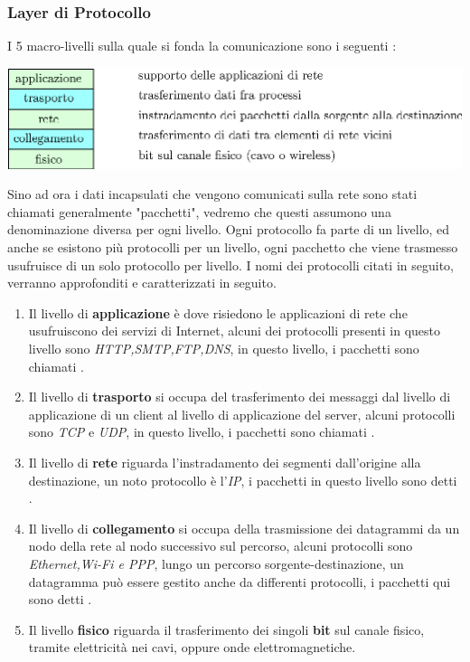\documentclass[12pt, letterpaper]{article}
\newcommand{\textg}[1]{\color{g}{\textbf{#1}}\color{black}}
\begin{document}
\subsubsection{Layer di Protocollo}
I 5 macro-livelli sulla quale si fonda la comunicazione sono i seguenti :
\begin{center}
    \includegraphics[width=1\textwidth ]{images/livelli.eps}
\end{center}
Sino ad ora i dati incapsulati che vengono comunicati sulla rete sono stati chiamati generalmente
"pacchetti", vedremo che questi assumono una denominazione diversa per ogni livello. Ogni protocollo
fa parte di un livello, ed anche se esistono più protocolli per un livello, ogni pacchetto
che viene trasmesso usufruisce di un solo protocollo per livello. I nomi dei protocolli citati in
seguito, verranno approfonditi e caratterizzati in seguito.
\begin{enumerate}
    \item Il livello di \textbf{applicazione} è dove risiedono le applicazioni di rete che
          usufruiscono dei servizi di Internet, alcuni dei protocolli presenti in questo livello
          sono \textit{HTTP,SMTP,FTP,DNS}, in questo livello, i pacchetti sono chiamati
          \textg{messaggi}.
    \item Il livello di \textbf{trasporto} si occupa del trasferimento dei messaggi  dal livello di
          applicazione di un client al livello di applicazione del server, alcuni protocolli sono
          \textit{TCP} e \textit{UDP}, in questo livello, i pacchetti sono chiamati
          \textg{segmenti}.
    \item Il livello di \textbf{rete} riguarda l'instradamento dei segmenti dall'origine alla
          destinazione, un noto protocollo è l'\textit{IP}, i pacchetti in questo livello sono detti
          \textg{datagrammi}.
    \item Il livello di \textbf{collegamento} si occupa della trasmissione dei datagrammi da un
          nodo della rete al nodo successivo sul percorso, alcuni protocolli sono \textit{Ethernet,Wi-Fi e
              PPP}, lungo un percorso sorgente-destinazione, un datagramma può essere gestito anche da
          differenti protocolli, i pacchetti qui sono detti \textg{frame}.
    \item Il livello \textbf{fisico} riguarda il trasferimento dei singoli \textbf{bit} sul canale
          fisico, tramite elettricità nei cavi, oppure onde elettromagnetiche.
\end{enumerate}
\end{document}
